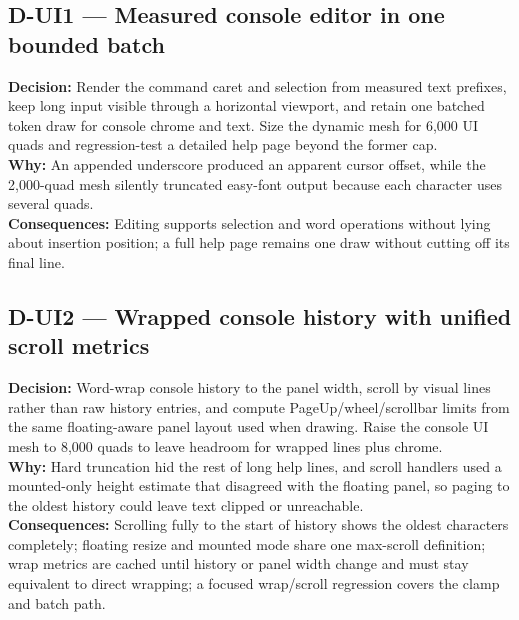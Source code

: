 \subsection*{D-UI1 --- Measured console editor in one bounded batch}
\begin{decisionbox}[title={D-UI1 \quad 2026-08-04}]
\textbf{Decision:} Render the command caret and selection from measured text
prefixes, keep long input visible through a horizontal viewport, and retain one
batched token draw for console chrome and text. Size the dynamic mesh for 6,000
UI quads and regression-test a detailed help page beyond the former cap.\\
\textbf{Why:} An appended underscore produced an apparent cursor offset, while
the 2,000-quad mesh silently truncated easy-font output because each character
uses several quads.\\
\textbf{Consequences:} Editing supports selection and word operations without
lying about insertion position; a full help page remains one draw without
cutting off its final line.
\end{decisionbox}

\subsection*{D-UI2 --- Wrapped console history with unified scroll metrics}
\begin{decisionbox}[title={D-UI2 \quad 2026-08-06}]
\textbf{Decision:} Word-wrap console history to the panel width, scroll by
visual lines rather than raw history entries, and compute PageUp/wheel/scrollbar
limits from the same floating-aware panel layout used when drawing. Raise the
console UI mesh to 8,000 quads to leave headroom for wrapped lines plus chrome.\\
\textbf{Why:} Hard truncation hid the rest of long help lines, and scroll
handlers used a mounted-only height estimate that disagreed with the floating
panel, so paging to the oldest history could leave text clipped or unreachable.\\
\textbf{Consequences:} Scrolling fully to the start of history shows the oldest
characters completely; floating resize and mounted mode share one max-scroll
definition; wrap metrics are cached until history or panel width change and
must stay equivalent to direct wrapping; a focused wrap/scroll regression
covers the clamp and batch path.
\end{decisionbox}

